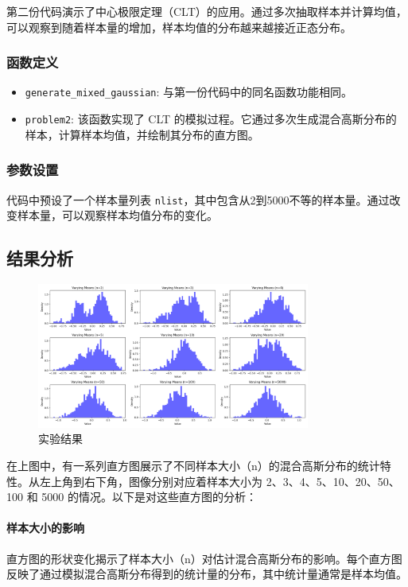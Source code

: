 \documentclass[a4paper]{article}
\begin{document}
第二份代码演示了中心极限定理（CLT）的应用。通过多次抽取样本并计算均值，可以观察到随着样本量的增加，样本均值的分布越来越接近正态分布。

\subsubsection{函数定义}
\begin{itemize}
  \item \texttt{generate\_mixed\_gaussian}: 与第一份代码中的同名函数功能相同。
  \item \texttt{problem2}: 该函数实现了 CLT 的模拟过程。它通过多次生成混合高斯分布的样本，计算样本均值，并绘制其分布的直方图。
\end{itemize}

\subsubsection{参数设置}

代码中预设了一个样本量列表 \texttt{nlist}，其中包含从2到5000不等的样本量。通过改变样本量，可以观察样本均值分布的变化。

\subsection{结果分析}

\begin{figure}[h]
  \centering
  \includegraphics[width=0.8\textwidth,height=0.3\textwidth]{1.png}
  \caption{实验结果}
  \label{fig:my_label}
\end{figure}

在上图中，有一系列直方图展示了不同样本大小（n）的混合高斯分布的统计特性。从左上角到右下角，图像分别对应着样本大小为 2、3、4、5、10、20、50、100 和 5000 的情况。以下是对这些直方图的分析：

\paragraph{样本大小的影响}
直方图的形状变化揭示了样本大小（n）对估计混合高斯分布的影响。每个直方图反映了通过模拟混合高斯分布得到的统计量的分布，其中统计量通常是样本均值。
\end{document}

